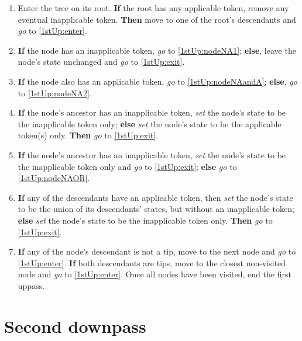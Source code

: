 \documentclass[a4paper,12pt]{article}
\begin{document}
\begin{enumerate}
    \item Enter the tree on its root. \textbf{If} the root has any applicable token, remove any eventual inapplicable token. \textbf{Then} move to one of the root's descendants and \textit{go} to \ref{1stUp:enter}.
    \item \label{1stUp:enter} \textbf{If} the node has an inapplicable token, \textit{go} to \ref{1stUp:nodeNA1}; \textbf{else}, leave the node's state unchanged and \textit{go} to \ref{1stUp:exit}.
    \item \label{1stUp:nodeNA1} \textbf{If} the node also has an applicable token, \textit{go} to \ref{1stUp:nodeNAandA}; \textbf{else}, \textit{go} to \ref{1stUp:nodeNA2}.
    \item \label{1stUp:nodeNAandA} \textbf{If} the node's ancestor has an inapplicable token, \textit{set} the node's state to be the inapplicable token only; \textbf{else} \textit{set} the node's state to be the applicable token(s) only. \textbf{Then} \textit{go} to \ref{1stUp:exit}.
    \item \label{1stUp:nodeNA2} \textbf{If} the node's ancestor has an inapplicable token, \textit{set} the node's state to be the inapplicable token only and \textit{go} to \ref{1stUp:exit}; \textbf{else} \textit{go} to \ref{1stUp:nodeNAOR}.
    \item \label{1stUp:nodeNAOR} \textbf{If} any of the descendants have an applicable token, then \textit{set} the node's state to be the union of its descendants' states, but without an inapplicable token; \textbf{else} \textit{set} the node's state to be the inapplicable token only. \textbf{Then} \textit{go} to \ref{1stUp:exit}.
    \item \label{1stUp:exit} \textbf{If} any of the node's descendant is not a tip, move to the next node and \textit{go} to \ref{1stUp:enter}. \textbf{If} both descendants are tips, move to the closest non-visited node and \textit{go} to \ref{1stUp:enter}. Once all nodes have been visited, end the first uppass.
\end{enumerate}


\section{Second downpass} \label{2ndDp}
\end{document}
